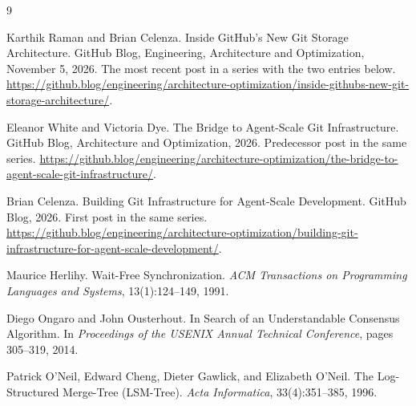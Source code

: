\documentclass[11pt]{article}
\theoremstyle{definition}
\theoremstyle{plain}
\begin{document}
\begin{thebibliography}{9}

Karthik Raman and Brian Celenza.
\newblock Inside GitHub's New Git Storage Architecture.
\newblock GitHub Blog, Engineering, Architecture and Optimization, November 5, 2026. The most recent post in a series with the two entries below. \url{https://github.blog/engineering/architecture-optimization/inside-githubs-new-git-storage-architecture/}.

Eleanor White and Victoria Dye.
\newblock The Bridge to Agent-Scale Git Infrastructure.
\newblock GitHub Blog, Architecture and Optimization, 2026. Predecessor post in the same series. \url{https://github.blog/engineering/architecture-optimization/the-bridge-to-agent-scale-git-infrastructure/}.

Brian Celenza.
\newblock Building Git Infrastructure for Agent-Scale Development.
\newblock GitHub Blog, 2026. First post in the same series. \url{https://github.blog/engineering/architecture-optimization/building-git-infrastructure-for-agent-scale-development/}.

Maurice Herlihy.
\newblock Wait-Free Synchronization.
\newblock \emph{ACM Transactions on Programming Languages and Systems}, 13(1):124--149, 1991.

Diego Ongaro and John Ousterhout.
\newblock In Search of an Understandable Consensus Algorithm.
\newblock In \emph{Proceedings of the USENIX Annual Technical Conference}, pages 305--319, 2014.

Patrick O'Neil, Edward Cheng, Dieter Gawlick, and Elizabeth O'Neil.
\newblock The Log-Structured Merge-Tree (LSM-Tree).
\newblock \emph{Acta Informatica}, 33(4):351--385, 1996.

\end{thebibliography}
\end{document}
